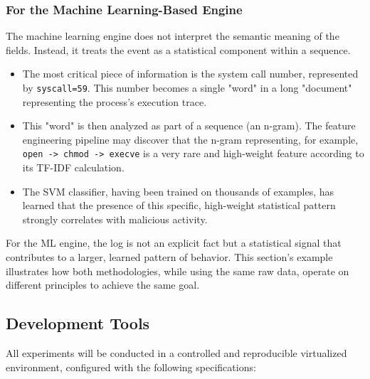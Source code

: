 \documentclass[journal]{./IEEEtran}
\begin{document}
\subsubsection*{For the Machine Learning-Based Engine}
The machine learning engine does not interpret the semantic meaning of the fields. Instead, it treats the event as a statistical component within a sequence.
\begin{itemize}
    \item The most critical piece of information is the system call number, represented by \texttt{syscall=59}. This number becomes a single "word" in a long "document" representing the process's execution trace.
    \item This "word" is then analyzed as part of a sequence (an n-gram). The feature engineering pipeline may discover that the n-gram representing, for example, \texttt{open -> chmod -> execve} is a very rare and high-weight feature according to its TF-IDF calculation.
    \item The SVM classifier, having been trained on thousands of examples, has learned that the presence of this specific, high-weight statistical pattern strongly correlates with malicious activity.
\end{itemize}
For the ML engine, the log is not an explicit fact but a statistical signal that contributes to a larger, learned pattern of behavior. This section's example illustrates how both methodologies, while using the same raw data, operate on different principles to achieve the same goal.

\subsection{Development Tools}
All experiments will be conducted in a controlled and reproducible virtualized environment, configured with the following specifications:
\end{document}
